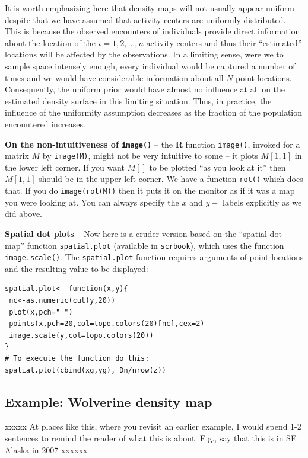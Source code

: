 It is worth emphasizing here that density maps will not usually appear
uniform despite that we have assumed that activity centers are
uniformly distributed. This is because the observed encounters of
individuals provide direct information about the location of the
$i=1,2,\ldots,n$ activity centers and thus their ``estimated''
locations will be affected by the observations. In a limiting sense,
were we to sample space intensely enough, every individual would be
captured a number of times and we would have considerable information
about all $N$ point locations. Consequently, the uniform prior would
have almost no influence at all on the estimated density surface in
this limiting situation. Thus, in practice, the influence of the
uniformity assumption decreases as the fraction of the population
encountered increases.

{\bf On the non-intuitiveness of \mbox{\tt image()} } -- the {\bf R}
function \mbox{\tt image()}, invoked for a matrix $M$ by \mbox{\tt image(M)}, might
not be very intuitive to some -- it plots $M[1,1]$ in the lower left
corner. If you want $M[]$ to be plotted ``as
you look at it'' then $M[1,1]$ should be in the upper left corner.  We
have a function \mbox{\tt rot()} which does that. If you do \mbox{\tt image(rot(M))} then it
puts it on the monitor as if it was a map you were looking at.  You
can always specify the $x$ and $y-$ labels explicitly as we did above.

{\bf Spatial dot plots } -- Now here is a cruder version based on the
``spatial dot map'' function \mbox{\tt spatial.plot} (available in
\mbox{\tt scrbook}), which uses
the function \mbox{\tt image.scale()}.
The \mbox{\tt spatial.plot} function requires arguments of point
locations and the resulting value to be displayed:
\begin{verbatim}
spatial.plot<- function(x,y){
 nc<-as.numeric(cut(y,20))
 plot(x,pch=" ")
 points(x,pch=20,col=topo.colors(20)[nc],cex=2)
 image.scale(y,col=topo.colors(20))
}
# To execute the function do this:
spatial.plot(cbind(xg,yg), Dn/nrow(z))
\end{verbatim}

\subsection{Example: Wolverine density map}

xxxxx
At places like this, where you revisit an earlier example, I would
spend 1-2 sentences to remind the reader of what this is about. E.g.,
say that this is in SE Alaska in 2007 
xxxxxx

